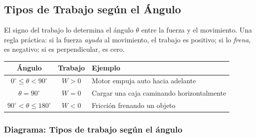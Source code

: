 \subsection{Tipos de Trabajo según el Ángulo}

\begin{seccion}
El signo del trabajo lo determina el ángulo $\theta$ entre la fuerza y el movimiento. Una regla práctica: si la fuerza \textit{ayuda} al movimiento, el trabajo es positivo; si lo \textit{frena}, es negativo; si es perpendicular, es cero.

\begin{center}
\begin{tabular}{|c|c|l|}
\hline
\rowcolor{azulmedio!30}
\textbf{Ángulo} & \textbf{Trabajo} & \textbf{Ejemplo} \\
\hline
$0^\circ \leq \theta < 90^\circ$ & $W > 0$ & Motor empuja auto hacia adelante \\
\hline
$\theta = 90^\circ$ & $W = 0$ & Cargar una caja caminando horizontalmente \\
\hline
$90^\circ < \theta \leq 180^\circ$ & $W < 0$ & Fricción frenando un objeto \\
\hline
\end{tabular}
\end{center}
\end{seccion}

\subsubsection{Diagrama: Tipos de trabajo según el ángulo}

